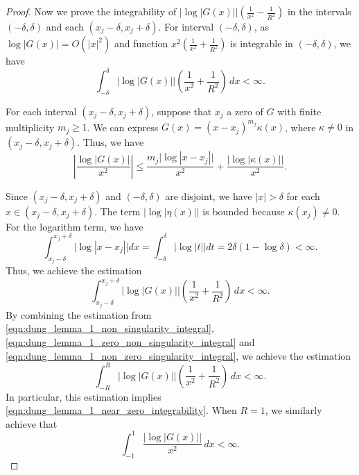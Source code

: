 \documentclass[11pt,twoside]{article} %
\begin{document}
\begin{proof}
Now we prove the integrability of $|\log|G(x)||\left(\frac{1}{x^2} - \frac{1}{R^2}\right)$ in the intervals $(-\delta,\delta)$ and each $(x_j-\delta,x_j+\delta)$. 
For interval $(-\delta,\delta)$, as $\log|G(x)| = O(|x|^2)$ and function $x^2(\frac{1}{x^2} + \frac{1}{R^2})$ is integrable in $(-\delta,\delta)$, we have 
\begin{equation}
\label{eqn:dung_lemma_1_zero_non_singularity_integral}
    \int_{-\delta}^{\delta}|\log|G(x)|| \left(\frac{1}{x^2} + \frac{1}{R^2}\right)\,dx < \infty. 
\end{equation}

For each interval $(x_j-\delta,x_j+\delta)$, suppose that $x_j$ a zero of $G$ with finite multiplicity $m_j \ge 1$. We can express $G(x) = (x-x_j)^{m_j} \kappa(x)$, where $\kappa \neq 0$ in $(x_j -\delta, x_j+\delta)$. Thus, we have
$$ \left| \frac{\log|G(x)|}{x^2} \right| \le \frac{m_j \big|\log|x-x_j|\big|}{x^2} + \frac{\big|\log|\kappa(x)|\big|}{x^2}.$$

Since $(x_j-\delta,x_j + \delta)$ and $(-\delta,\delta)$ are disjoint, we have $|x| > \delta$ for each $x \in (x_j-\delta,x_j + \delta)$.  The term $\big|\log|\eta(x)|\big|$ is bounded because $\kappa(x_j) \neq 0$. For the logarithm term, we have 
$$ \int_{x_j-\delta}^{x_j+\delta} \big|\log|x-x_j|\big| dx = \int_{-\delta}^\delta |\log|t|| dt = 2\delta(1 - \log\delta) < \infty.$$
Thus, we achieve the estimation 
\begin{equation}
\label{eqn:dung_lemma_1_non_zero_singularity_integral}
    \int_{x_j-\delta}^{x_j+\delta} |\log|G(x)|| \left(\frac{1}{x^2} + \frac{1}{R^2}\right)\,dx < \infty. 
\end{equation}
By combining the estimation from \eqref{eqn:dung_lemma_1_non_singularity_integral}, \eqref{eqn:dung_lemma_1_zero_non_singularity_integral} and \eqref{eqn:dung_lemma_1_non_zero_singularity_integral}, we achieve the estimation 
\begin{equation*}
    \int_{-R}^R |\log|G(x)||\left(\frac{1}{x^2}+\frac{1}{R^2}\right)\,dx < \infty. 
\end{equation*}
In particular, this estimation implies \eqref{eqn:dung_lemma_1_near_zero_integrability}. When $R = 1$, we similarly achieve that  
\begin{equation}
\label{eqn:dung_lemma_1_log_G_over_x_square}
    \int_{-1}^1 \frac{|\log|G(x)||}{x^2}\,dx < \infty. 
\end{equation}


\end{proof}
\end{document}
